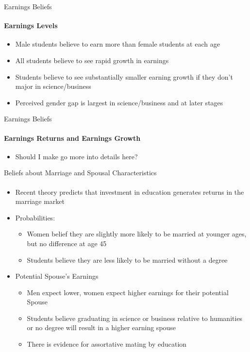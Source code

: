 \documentclass[12pt]{beamer}
\begin{document}
\begin{frame}{Earnings Beliefs}
    \framesubtitle{Earnings Levels} 
    \begin{itemize}
        \item Male students believe to earn more than female students at each age
        \item All students believe to see rapid growth in earnings
        \item Students believe to see substantially smaller earning growth if they don't major in science/business
        \item Perceived gender gap is largest in science/business and at later stages
    \end{itemize}
\end{frame}

\begin{frame}{Earnings Beliefs}
    \framesubtitle{Earnings Returns and Earnings Growth} 
    \begin{itemize}
        \item Should I make go more into details here?
    \end{itemize}
\end{frame}

\begin{frame}{Beliefs about Marriage and Spousal Characteristics}
    \framesubtitle{} 
    \begin{itemize}
        \item Recent theory predicts that investment in education generates returns in the marriage market
        \item Probabilities: 
        \begin{itemize}
            \item Women belief they are slightly more likely to be married at younger ages, but no difference at age 45
            \item Students believe they are less likely to be married without a degree
        \end{itemize}
        \item Potential Spouse's Earnings
        \begin{itemize}
            \item Men expect lower, women expect higher earnings for their potential Spouse
            \item Students believe graduating in science or business relative to humanities or no degree will result in a higher earning spouse
            \item There is evidence for assortative mating by education
        \end{itemize}
    \end{itemize}
\end{frame}
\end{document}
